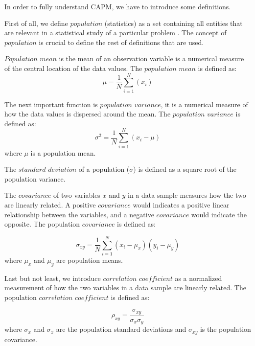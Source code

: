 In order to fully understand CAPM, we have to introduce some definitions.

First of all, we define $population$ (statistics) as a set containing all entities that are relevant in a statistical study of a particular problem \cite{Oxford}.
The concept of $population$ is crucial to define the rest of definitions that are used.

$Population$ $mean$ is the mean of an observation variable is a numerical measure of the central location of the data values.
	The $population$ $mean$ is defined as:
	 \begin{equation}
			\mu = \frac{1}{N} \sum_{i=1}^{N}{(x_{i})} 
		      \end{equation}

The next important function is $population$ $variance$, it is a numerical measure of how the data values is dispersed around the mean.
	The $population$ $variance$ is defined as:  
	      \begin{equation}
			\sigma^2 = \frac{1}{N} \sum_{i=1}^{N}{(x_{i} - \mu)} 
		      \end{equation}
	where $\mu$ is a population mean.

The $standard$ $deviation$ of a population ($\sigma$) is defined as a square root of the population variance.
	
The $covariance$ of two variables $x$ and $y$ in a data sample measures how the two are linearly related.
	A positive $covariance$ would indicates a positive linear relationship between the variables, and a negative $covariance$ would indicate the opposite. 
	The population $covariance$ is defined as:

	\begin{equation}
			\sigma_{xy} = \frac{1}{N} \sum_{i=1}^{N}{(x_{i} - \mu_{x})(y_{i} - \mu_{y})} 
		      \end{equation}
	where $\mu_{x}$ and $\mu_{y}$ are population means.

Last but not least, we introduce $correlation$ $coefficient$ as a normalized measurement of how the two variables in a data sample are linearly related.
	The population $correlation$ $coefficient$ is defined as:

	\begin{equation}
	  \rho_{xy} = \frac{\sigma_{xy}}{\sigma_{x} \sigma_{y}}
	\end{equation}
	where $\sigma_{x}$ and $\sigma_{x}$ are the population standard deviations and $\sigma_{xy}$ is the population covariance.
	

